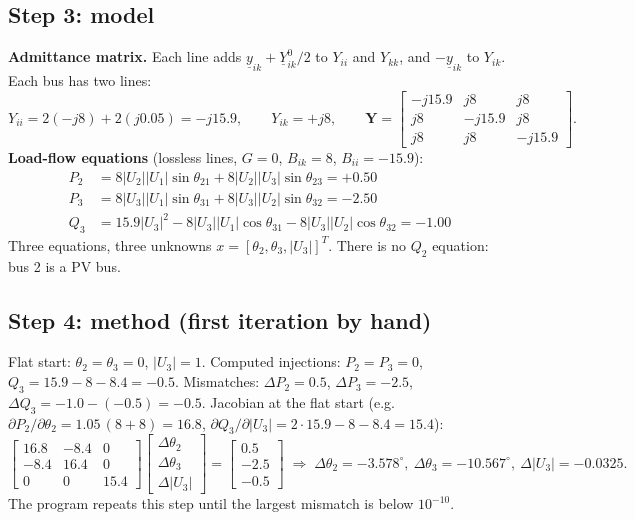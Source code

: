 \documentclass[11pt,a4paper]{article}
\begin{document}
\subsection{Step 3: model}
\textbf{Admittance matrix.} Each line adds $\underline y_{ik} + \underline Y^0_{ik}/2$ to $Y_{ii}$ and $Y_{kk}$, and $-\underline y_{ik}$ to $Y_{ik}$. Each bus has two lines:
\[ Y_{ii} = 2(-j8) + 2(j0.05) = -j15.9, \qquad Y_{ik} = +j8, \qquad
\mathbf Y = \begin{bmatrix} -j15.9 & j8 & j8 \\ j8 & -j15.9 & j8 \\ j8 & j8 & -j15.9 \end{bmatrix}. \]
\textbf{Load-flow equations} (lossless lines, $G = 0$, $B_{ik} = 8$, $B_{ii} = -15.9$):
\begin{align*}
P_2 &= 8|U_2||U_1|\sin\theta_{21} + 8|U_2||U_3|\sin\theta_{23} = +0.50\\
P_3 &= 8|U_3||U_1|\sin\theta_{31} + 8|U_3||U_2|\sin\theta_{32} = -2.50\\
Q_3 &= 15.9|U_3|^2 - 8|U_3||U_1|\cos\theta_{31} - 8|U_3||U_2|\cos\theta_{32} = -1.00
\end{align*}
Three equations, three unknowns $x = [\theta_2, \theta_3, |U_3|]^T$. There is no $Q_2$ equation: bus 2 is a PV bus.

\subsection{Step 4: method (first iteration by hand)}
Flat start: $\theta_2 = \theta_3 = 0$, $|U_3| = 1$. Computed injections: $P_2 = P_3 = 0$, $Q_3 = 15.9 - 8 - 8.4 = -0.5$.
Mismatches: $\Delta P_2 = 0.5$, $\Delta P_3 = -2.5$, $\Delta Q_3 = -1.0 - (-0.5) = -0.5$.
Jacobian at the flat start (e.g.\ $\partial P_2/\partial\theta_2 = 1.05\,(8 + 8) = 16.8$,
$\partial Q_3/\partial|U_3| = 2\cdot15.9 - 8 - 8.4 = 15.4$):
\[ \begin{bmatrix} 16.8 & -8.4 & 0\\ -8.4 & 16.4 & 0\\ 0 & 0 & 15.4\end{bmatrix}
\begin{bmatrix}\Delta\theta_2\\ \Delta\theta_3\\ \Delta|U_3|\end{bmatrix} = \begin{bmatrix}0.5\\ -2.5\\ -0.5\end{bmatrix}
\;\Rightarrow\; \Delta\theta_2 = -3.578^\circ,\ \Delta\theta_3 = -10.567^\circ,\ \Delta|U_3| = -0.0325. \]
The program repeats this step until the largest mismatch is below $10^{-10}$.
\end{document}
